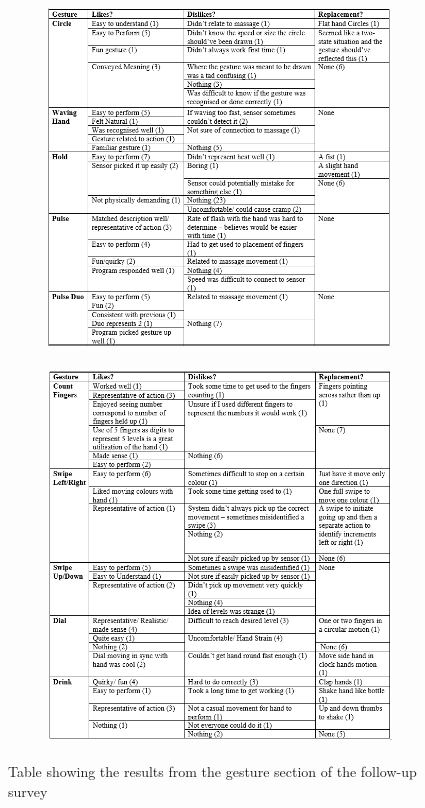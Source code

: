 \documentclass{l4proj}
\begin{document}
\begin{figure}[!htb]
    \centering
    \begin{subfigure}[b]{1\textwidth}
        \includegraphics[width=15cm,height=9cm]{images/gestureSurvey1.png}
    \end{subfigure}
    \begin{subfigure}[b]{1\textwidth}
        \includegraphics[width=15cm,height=10cm]{images/gestureSurvey2.png}
    \end{subfigure}
    \caption{Table showing the results from the gesture section of the follow-up survey}
    \label{fig:gestureSurvey}
\end{figure}
\end{document}
